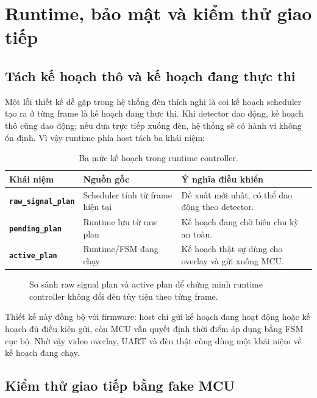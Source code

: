 \section{Runtime, bảo mật và kiểm thử giao tiếp}

\subsection{Tách kế hoạch thô và kế hoạch đang thực thi}

Một lỗi thiết kế dễ gặp trong hệ thống đèn thích nghi là coi kế hoạch scheduler tạo ra ở từng frame là kế hoạch đang thực thi. Khi detector dao động, kế hoạch thô cũng dao động; nếu đưa trực tiếp xuống đèn, hệ thống sẽ có hành vi không ổn định. Vì vậy runtime phía host tách ba khái niệm:

\begin{table}[H]
\centering
\caption{Ba mức kế hoạch trong runtime controller.}
\label{tab:plan-levels}
\small
\begin{tabularx}{\linewidth}{>{\bfseries}p{3.8cm}YY}
\toprule
Khái niệm & Nguồn gốc & Ý nghĩa điều khiển \\
\midrule
\texttt{raw\_signal\_plan} & Scheduler tính từ frame hiện tại & Đề xuất mới nhất, có thể dao động theo detector. \\
\texttt{pending\_plan} & Runtime lưu từ raw plan & Kế hoạch đang chờ biên chu kỳ an toàn. \\
\texttt{active\_plan} & Runtime/FSM đang chạy & Kế hoạch thật sự dùng cho overlay và gửi xuống MCU. \\
\bottomrule
\end{tabularx}
\normalsize
\end{table}

\begin{figure}[H]
  \centering
  \caption{So sánh raw signal plan và active plan để chứng minh runtime controller không đổi đèn tùy tiện theo từng frame.}
  \label{fig:raw-active}
\end{figure}

Thiết kế này đồng bộ với firmware: host chỉ gửi kế hoạch đang hoạt động hoặc kế hoạch đủ điều kiện gửi, còn MCU vẫn quyết định thời điểm áp dụng bằng FSM cục bộ. Nhờ vậy video overlay, UART và đèn thật cùng dùng một khái niệm về kế hoạch đang chạy.

\subsection{Kiểm thử giao tiếp bằng fake MCU}

